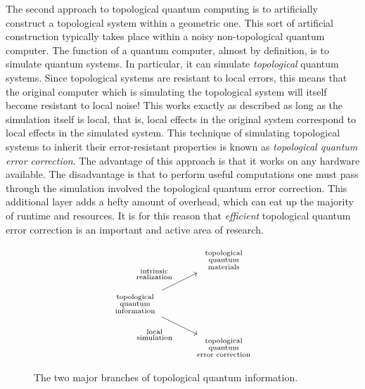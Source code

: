 The second approach to topological quantum computing is to artificially construct a topological system within a geometric one. This sort of artificial construction typically takes place within a noisy non-topological quantum computer. The function of a quantum computer, almost by definition, is to simulate quantum systems. In particular, it can simulate {\em topological} quantum systems. Since topological systems are resistant to local errors, this means that the original computer which is simulating the topological system will itself become resistant to local noise! This works exactly as described as long as the simulation itself is local, that is, local effects in the original system correspond to local effects in the simulated system. This technique of simulating topological systems to inherit their error-resistant properties is known as {\em topological quantum error correction}. The advantage of this approach is that it works on any hardware available. The disadvantage is that to perform useful computations one must pass through the simulation involved the topological quantum error correction. This additional layer adds a hefty amount of overhead, which can eat up the majority of runtime and resources. It is for this reason that {\em efficient} topological quantum error correction is an important and active area of research.

\begin{figure}
\[\begin{tikzcd}
	& \begin{array}{c} \substack{\text{topological}\\ \text{quantum}\\\text{materials}} \end{array} \\
	\begin{array}{c} \substack{\text{topological} \\ \text{quantum} \\ \text{information}} \end{array} \\
	& \begin{array}{c} \substack{\text{topological}\\\text{quantum}\\ \text{error correction}} \end{array}
	\arrow["\begin{array}{c} \substack{\text{intrinsic}\\\text{realization}} \end{array}", from=2-1, to=1-2]
	\arrow["\begin{array}{c} \substack{\text{local}\\\text{simulation}} \end{array}"', from=2-1, to=3-2]
\end{tikzcd}\]
\caption{The two major branches of topological quantum information.}
\end{figure}

